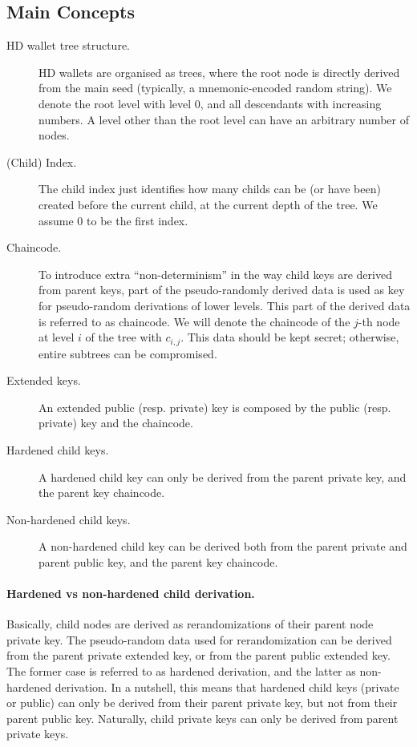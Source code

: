 \subsection{Main Concepts}

\begin{description}
\item[HD wallet tree structure.] HD wallets are organised as trees, where the
  root node is directly derived from the main seed (typically, a mnemonic-encoded
  random string). We denote the root level with level $0$, and all descendants
  with increasing numbers. A level other than the root level can have an
  arbitrary number of nodes.
\item[(Child) Index.] The child index just identifies how many childs can be (or
  have been) created before the current child, at the current depth of the tree.
  We assume $0$ to be the first index.
\item[Chaincode.] To introduce extra ``non-determinism'' in the way child keys
  are derived from parent keys, part of the pseudo-randomly derived data is
  used as key for pseudo-random derivations of lower levels. This part of the
  derived data is referred to as chaincode. We will denote the chaincode of the
  $j$-th node at level $i$ of the tree with $c_{i,j}$. This data should be kept
  secret; otherwise, entire subtrees can be compromised.
\item[Extended keys.] An extended public (resp. private) key is composed by the
  public (resp. private) key and the chaincode.  
\item[Hardened child keys.] A hardened child key can only be derived from the
  parent private key, and the parent key chaincode. 
\item[Non-hardened child keys.] A non-hardened child key can be derived both
  from the parent private and parent public key, and the parent key chaincode.
\end{description}

\paragraph{Hardened vs non-hardened child derivation.} Basically, child nodes
are derived as rerandomizations of their parent node private key. The
pseudo-random data used for rerandomization can be derived from the parent
private extended key, or from the parent public extended key. The former case is
referred to as hardened derivation, and the latter as non-hardened derivation.
In a nutshell, this means that hardened child keys (private or public) can only
be derived from their parent private key, but not from their parent public key.
Naturally, child private keys can only be derived from parent private keys.

